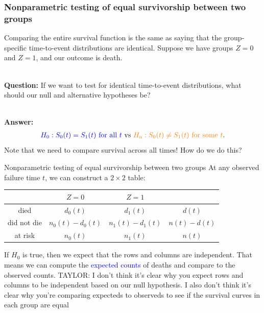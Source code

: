 \documentclass[10pt,t]{beamer}
\begin{document}
\begin{frame}
\frametitle{Nonparametric testing of equal survivorship between two groups}

Comparing the entire survival function is the same as saying that the group-specific time-to-event distributions are identical. Suppose we have groups $Z = 0$ and $Z = 1$, and our outcome is death.
\\ ~\ 

\textbf{Question:} If we want to test for identical time-to-event distributions, what should our null and alternative hypotheses be? \pause 
\\ ~\ 

\textbf{Answer:}
\begin{align*}
\textcolor{blue}{H_0: S_0(t) = S_1(t) \text{ for all } t} \ \text{vs} \ \textcolor{orange}{H_a: S_0(t) \neq S_1(t) \text{ for some }t}.
\end{align*} \pause 
Note that we need to compare survival across all times! How do we do this? 
\end{frame}

\begin{frame}{Nonparametric testing of equal survivorship between two groups}
At any observed failure time $t$, we can construct a $2 \times 2$ table:\vspace{-0.2cm}

\begin{center}
	\begin{tabular}{c|c|c|c}
		& $Z = 0$ & $Z = 1$ \\
		\hline
		died & $d_0(t)$ & $d_1(t)$ & $d(t)$ \\
		did not die & $n_0(t) - d_0(t)$ & $n_1(t) - d_1(t)$ & $n(t) - d(t)$\\
		at risk & $n_0(t)$ & $n_1(t)$ & $n(t)$
	\end{tabular}
\end{center}\vspace{-0.2cm}

If $H_0$ is true, then we expect that the rows and columns are independent. That means we can compute the \textcolor{blue}{expected counts} of deaths and compare to the observed counts. TAYLOR: I don't think it's clear why you expect rows and columns to be independent based on our null hypothesis. I also don't think it's clear why you're comparing expecteds to observeds to see if the survival curves in each group are equal
\end{frame}
\end{document}
